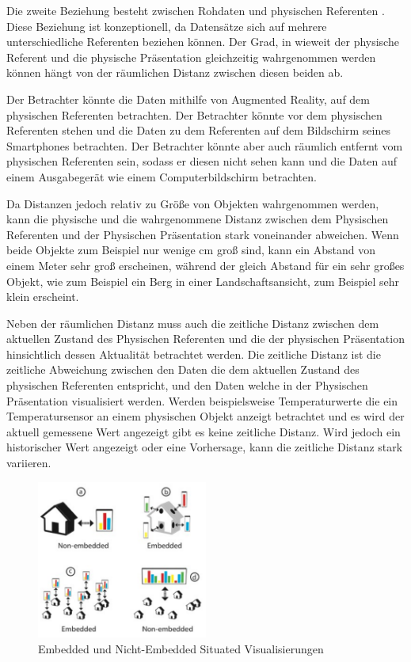 Die zweite Beziehung besteht zwischen Rohdaten und physischen Referenten . Diese Beziehung ist konzeptionell, da Datensätze sich auf mehrere unterschiedliche Referenten beziehen können. 
Der Grad, in wieweit der physische Referent und die physische Präsentation gleichzeitig wahrgenommen werden können hängt von der räumlichen Distanz zwischen diesen beiden ab. 

Der Betrachter könnte die Daten mithilfe von Augmented Reality, auf dem physischen Referenten betrachten. Der Betrachter könnte vor dem physischen Referenten stehen und die Daten zu dem Referenten auf
dem Bildschirm seines Smartphones betrachten. Der Betrachter könnte aber auch räumlich entfernt vom physischen Referenten sein, sodass er diesen nicht sehen kann und die Daten auf einem Ausgabegerät 
wie einem Computerbildschirm betrachten. 

\cite[S.~194]{ElSayedNevenA.M.BruceH.ThomasRossT.Smith2015} Da Distanzen jedoch relativ zu Größe von Objekten wahrgenommen werden, kann die physische und die wahrgenommene Distanz zwischen dem Physischen Referenten und der Physischen Präsentation stark voneinander abweichen. Wenn beide Objekte zum Beispiel nur wenige cm groß sind, kann ein Abstand von einem Meter sehr groß erscheinen, während der gleich Abstand für ein sehr großes Objekt, wie zum Beispiel ein Berg in einer Landschaftsansicht, zum Beispiel sehr klein erscheint. 

\cite{WesleyWillettYvonneJansen} Neben der räumlichen Distanz muss auch die zeitliche Distanz zwischen dem aktuellen Zustand des Physischen Referenten und die der physischen Präsentation hinsichtlich dessen 
Aktualität betrachtet werden. 
Die zeitliche Distanz ist die zeitliche Abweichung zwischen den Daten die dem aktuellen Zustand des physischen Referenten entspricht, und den Daten welche in der Physischen Präsentation visualisiert werden.
Werden beispielsweise Temperaturwerte die ein Temperatursensor an einem physischen Objekt anzeigt betrachtet und es wird der aktuell gemessene Wert angezeigt gibt es keine zeitliche Distanz. Wird jedoch ein
historischer Wert angezeigt oder eine Vorhersage, kann die zeitliche Distanz stark variieren.

\begin{figure}[H]
	\centering
	\includegraphics[width=0.5\textwidth]{resources/fundamentals/situated_visualization/embedded_visualization.png}
	\caption{Embedded und Nicht-Embedded Situated Visualisierungen}
	\label{img:embedded_visualization}
\end{figure}


